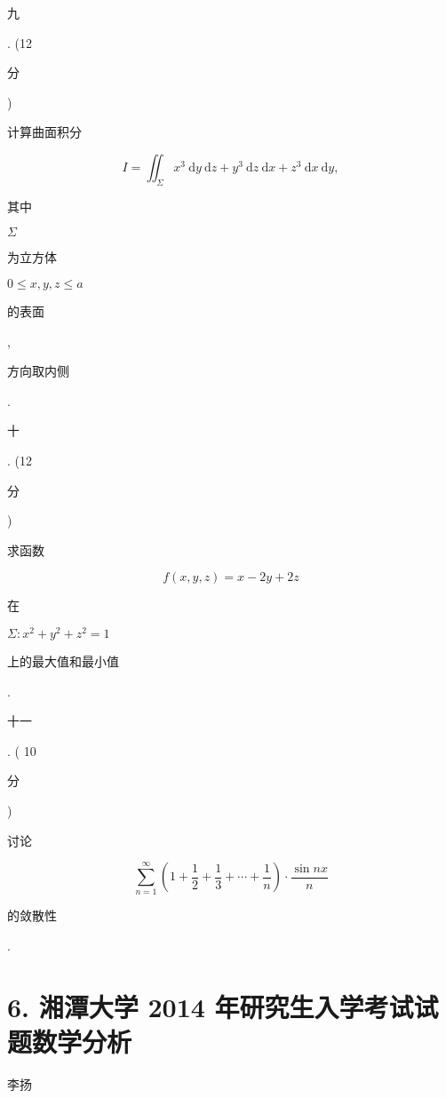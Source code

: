 \documentclass[10pt]{article}
\begin{document}
\begin{CJK}{UTF8}{mj}九\end{CJK}. (12 \begin{CJK}{UTF8}{mj}分\end{CJK}) \begin{CJK}{UTF8}{mj}计算曲面积分\end{CJK}
$$
I=\iint_{\Sigma} x^{3} \mathrm{~d} y \mathrm{~d} z+y^{3} \mathrm{~d} z \mathrm{~d} x+z^{3} \mathrm{~d} x \mathrm{~d} y,
$$
\begin{CJK}{UTF8}{mj}其中\end{CJK} $\Sigma$ \begin{CJK}{UTF8}{mj}为立方体\end{CJK} $0 \leqslant x, y, z \leqslant a$ \begin{CJK}{UTF8}{mj}的表面\end{CJK}, \begin{CJK}{UTF8}{mj}方向取内侧\end{CJK}. \begin{CJK}{UTF8}{mj}十\end{CJK}. (12 \begin{CJK}{UTF8}{mj}分\end{CJK}) \begin{CJK}{UTF8}{mj}求函数\end{CJK}
$$
f(x, y, z)=x-2 y+2 z
$$
\begin{CJK}{UTF8}{mj}在\end{CJK} $\Sigma: x^{2}+y^{2}+z^{2}=1$ \begin{CJK}{UTF8}{mj}上的最大值和最小值\end{CJK}.

\begin{CJK}{UTF8}{mj}十一\end{CJK}. ( 10 \begin{CJK}{UTF8}{mj}分\end{CJK}) \begin{CJK}{UTF8}{mj}讨论\end{CJK}
$$
\sum_{n=1}^{\infty}\left(1+\frac{1}{2}+\frac{1}{3}+\cdots+\frac{1}{n}\right) \cdot \frac{\sin n x}{n}
$$
\begin{CJK}{UTF8}{mj}的敛散性\end{CJK}.

\section{6. 湘潭大学 2014 年研究生入学考试试题数学分析}
\begin{CJK}{UTF8}{mj}李扬\end{CJK}
\end{document}
